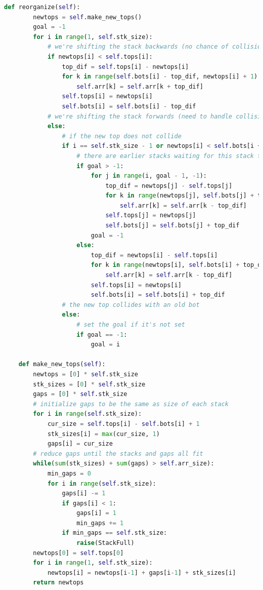 \documentclass[12pt]{report}
\begin{document}
\begin{lstlisting}[language=Python, caption=multistack.py]
    def reorganize(self):
        newtops = self.make_new_tops()
        goal = -1
        for i in range(1, self.stk_size):
            # we're shifting the stack backwards (no chance of collision)
            if newtops[i] < self.tops[i]:
                top_dif = self.tops[i] - newtops[i]
                for k in range(self.bots[i] - top_dif, newtops[i] + 1):
                    self.arr[k] = self.arr[k + top_dif]
                self.tops[i] = newtops[i]
                self.bots[i] = self.bots[i] - top_dif
            # we're shifting the stack forwards (need to handle collisions)
            else:
                # if the new top does not collide
                if i == self.stk_size - 1 or newtops[i] < self.bots[i + 1]:
                    # there are earlier stacks waiting for this stack to resolve first
                    if goal > -1:
                        for j in range(i, goal - 1, -1):
                            top_dif = newtops[j] - self.tops[j]
                            for k in range(newtops[j], self.bots[j] + top_dif - 1, -1):
                                self.arr[k] = self.arr[k - top_dif]
                            self.tops[j] = newtops[j]
                            self.bots[j] = self.bots[j] + top_dif
                        goal = -1
                    else:
                        top_dif = newtops[i] - self.tops[i]
                        for k in range(newtops[i], self.bots[i] + top_dif - 1, -1):
                            self.arr[k] = self.arr[k - top_dif]
                        self.tops[i] = newtops[i]
                        self.bots[i] = self.bots[i] + top_dif
                # the new top collides with an old bot
                else:
                    # set the goal if it's not set
                    if goal == -1:
                        goal = i
    
    def make_new_tops(self):
        newtops = [0] * self.stk_size
        stk_sizes = [0] * self.stk_size
        gaps = [0] * self.stk_size
        # initialize gaps to be the same as size of each stack
        for i in range(self.stk_size):
            cur_size = self.tops[i] - self.bots[i] + 1
            stk_sizes[i] = max(cur_size, 1)
            gaps[i] = cur_size
        # reduce gaps until the stacks and gaps all fit
        while(sum(stk_sizes) + sum(gaps) > self.arr_size):
            min_gaps = 0
            for i in range(self.stk_size):
                gaps[i] -= 1
                if gaps[i] < 1:
                    gaps[i] = 1
                    min_gaps += 1
                if min_gaps == self.stk_size:
                    raise(StackFull)
        newtops[0] = self.tops[0]
        for i in range(1, self.stk_size):
            newtops[i] = newtops[i-1] + gaps[i-1] + stk_sizes[i]
        return newtops
\end{lstlisting}
\end{document}
